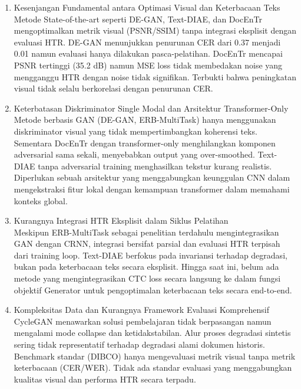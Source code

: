 \documentclass[12pt,a4paper]{article}
\begin{document}
\begin{enumerate}[label=\arabic*., leftmargin=0.5cm]
    \item Kesenjangan Fundamental antara Optimasi Visual dan Keterbacaan Teks \\
    Metode State-of-the-art seperti DE-GAN, Text-DIAE, dan DocEnTr mengoptimalkan metrik visual (PSNR/SSIM) tanpa integrasi eksplisit dengan evaluasi HTR. DE-GAN menunjukkan penurunan CER dari 0.37 menjadi 0.01 namun evaluasi hanya dilakukan pasca-pelatihan. DocEnTr mencapai PSNR tertinggi (35.2 dB) namun MSE loss tidak membedakan noise yang mengganggu HTR dengan noise tidak signifikan. Terbukti bahwa peningkatan visual tidak selalu berkorelasi dengan penurunan CER.

    \item Keterbatasan Diskriminator Single Modal dan Arsitektur Transformer-Only \\
    Metode berbasis GAN (DE-GAN, ERB-MultiTask) hanya menggunakan diskriminator visual yang tidak mempertimbangkan koherensi teks. Sementara DocEnTr dengan transformer-only menghilangkan komponen adversarial sama sekali, menyebabkan output yang over-smoothed. Text-DIAE tanpa adversarial training menghasilkan tekstur kurang realistis. Diperlukan sebuah arsitektur yang menggabungkan keunggulan CNN dalam mengekstraksi fitur lokal dengan kemampuan transformer dalam memahami konteks global.

    \item Kurangnya Integrasi HTR Eksplisit dalam Siklus Pelatihan \\
    Meskipun ERB-MultiTask sebagai penelitian terdahulu mengintegrasikan GAN dengan CRNN, integrasi bersifat parsial dan evaluasi HTR terpisah dari training loop. Text-DIAE berfokus pada invariansi terhadap degradasi, bukan pada keterbacaan teks secara eksplisit. Hingga saat ini, belum ada metode yang mengintegrasikan CTC loss secara langsung ke dalam fungsi objektif Generator untuk pengoptimalan keterbacaan teks secara end-to-end.

    \item Kompleksitas Data dan Kurangnya Framework Evaluasi Komprehensif \\
    CycleGAN menawarkan solusi pembelajaran tidak berpasangan namun mengalami mode collapse dan ketidakstabilan. Alur proses degradasi sintetis sering tidak representatif terhadap degradasi alami dokumen historis. Benchmark standar (DIBCO) hanya mengevaluasi metrik visual tanpa metrik keterbacaan (CER/WER). Tidak ada standar evaluasi yang menggabungkan kualitas visual dan performa HTR secara terpadu.
\end{enumerate}
\end{document}
